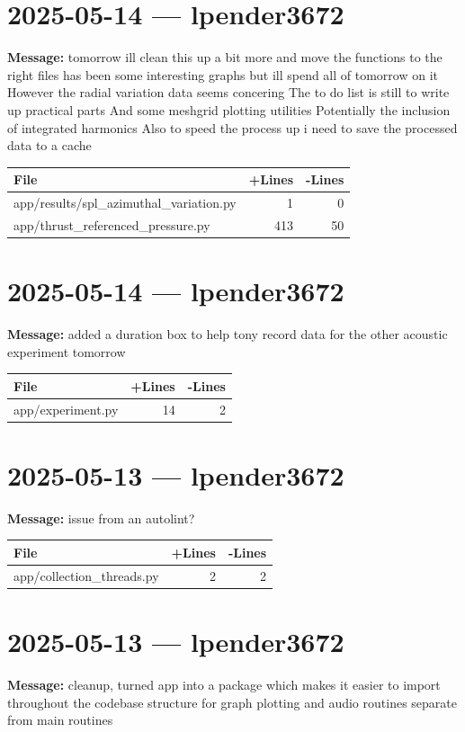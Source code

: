 \documentclass{article}
\begin{document}
\section*{2025-05-14 --- lpender3672}
\textbf{Message:} tomorrow ill clean this up a bit more and move the functions to the right files has been some interesting graphs but ill spend all of tomorrow on it However the radial variation data seems concering The to do list is still to write up practical parts And some meshgrid plotting utilities Potentially the inclusion of integrated harmonics Also to speed the process up i need to save the processed data to a cache

\begin{longtable}{|p{10cm}|r|r|}
\hline \textbf{File} & \textbf{+Lines} & \textbf{-Lines} \\
\hline
app/results/spl\_azimuthal\_variation.py & 1 & 0 \\
\hline
app/thrust\_referenced\_pressure.py & 413 & 50 \\
\hline
\end{longtable}

\section*{2025-05-14 --- lpender3672}
\textbf{Message:} added a duration box to help tony record data for the other acoustic experiment tomorrow

\begin{longtable}{|p{10cm}|r|r|}
\hline \textbf{File} & \textbf{+Lines} & \textbf{-Lines} \\
\hline
app/experiment.py & 14 & 2 \\
\hline
\end{longtable}

\section*{2025-05-13 --- lpender3672}
\textbf{Message:} issue from an autolint?

\begin{longtable}{|p{10cm}|r|r|}
\hline \textbf{File} & \textbf{+Lines} & \textbf{-Lines} \\
\hline
app/collection\_threads.py & 2 & 2 \\
\hline
\end{longtable}

\section*{2025-05-13 --- lpender3672}
\textbf{Message:} cleanup, turned app into a package which makes it easier to import throughout the codebase structure for graph plotting and audio routines separate from main routines
\end{document}

